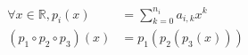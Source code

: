 \documentclass[preview]{standalone}
\begin{document}
\begin{align*}
\forall x \in \mathbb{R}, p_i(x) & = \sum_{k=0}^{n_i} a_{i,k} x^k \\(p_1 \circ p_2 \circ p_3)(x) & = p_1(p_2(p_3(x)))
\end{align*}
\end{document}

